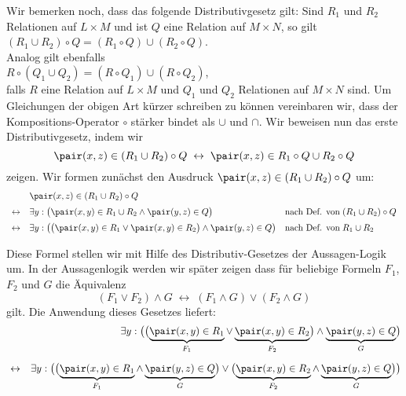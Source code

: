 \noindent
Wir bemerken noch, dass das folgende Distributivgesetz gilt: Sind $R_1$ und $R_2$
Relationen auf $L \times M$ und ist $Q$ eine Relation auf $M \times N$, so gilt \\[0.2cm]
\hspace*{1.3cm}  $(R_1 \cup R_2) \circ Q = (R_1 \circ Q) \cup (R_2 \circ Q)$. \\[0.2cm]
Analog gilt ebenfalls \\[0.2cm]
\hspace*{1.3cm}  $R \circ (Q_1 \cup Q_2) = (R \circ Q_1) \cup (R \circ Q_2)$, \\[0.2cm]
falls $R$ eine Relation auf $L \times M$ und $Q_1$ und $Q_2$ Relationen auf $M \times N$
sind.  Um Gleichungen der obigen Art kürzer schreiben zu können vereinbaren wir, dass der
Kompositions-Operator $\circ$ stärker bindet als $\cup$ und $\cap$.  Wir beweisen nun das
erste Distributivgesetz, indem wir 
\begin{equation}
  \label{eq:dis0}
\pair(x,z) \in (R_1 \cup R_2) \circ Q \;\leftrightarrow\; \pair(x,z) \in R_1 \circ Q \cup R_2 \circ Q   
\end{equation}
zeigen.  Wir formen zunächst den Ausdruck $\pair(x,z) \in (R_1 \cup R_2) \circ Q$ um:
\[
\begin{array}{cll}
                  & \pair(x,z) \in (R_1 \cup R_2) \circ Q  \\[0.2cm]
  \leftrightarrow & \exists y: \bigl(\pair(x,y) \in R_1 \cup R_2 \wedge \pair(y,z) \in Q\bigr) 
                  & \mbox{nach Def. von}\; (R_1 \cup R_2) \circ Q \\[0.2cm]
  \leftrightarrow & \exists y: \bigl(\bigl(\pair(x,y) \in R_1 \vee \pair(x,y) \in R_2\bigr) \wedge \pair(y,z) \in Q\bigr) 
                  & \mbox{nach Def. von}\; R_1 \cup R_2 \\[0.2cm]
\end{array}
\]
Diese Formel stellen wir mit Hilfe des Distributiv-Gesetzes der Aussagen-Logik um.
In der Aussagenlogik werden wir später zeigen dass für beliebige Formeln
$F_1$, $F_2$ und $G$ die Äquivalenz 
\[ (F_1 \vee F_2) \wedge G \;\leftrightarrow\; (F_1 \wedge G) \vee (F_2 \wedge G) \]
gilt.  Die Anwendung dieses Gesetzes liefert:
\begin{eqnarray}
  \nonumber
  & & \exists y: \bigl(\bigl(\underbrace{\pair(x,y) \in R_1}_{F_1} \vee \underbrace{\pair(x,y) \in R_2}_{F_2}\bigr) \wedge \underbrace{\pair(y,z) \in Q}_G\bigr) 
\\[0.2cm] 
  \label{eq:dis1}
  & \leftrightarrow &
    \exists y: \bigl(\bigl(\underbrace{\pair(x,y) \in R_1}_{F_1} \wedge \underbrace{\pair(y,z) \in Q}_G \bigr) \vee 
               \bigl(\underbrace{\pair(x,y) \in R_2}_{F_2} \wedge \underbrace{\pair(y,z) \in Q}_G \bigr) \bigr)   
\end{eqnarray}
